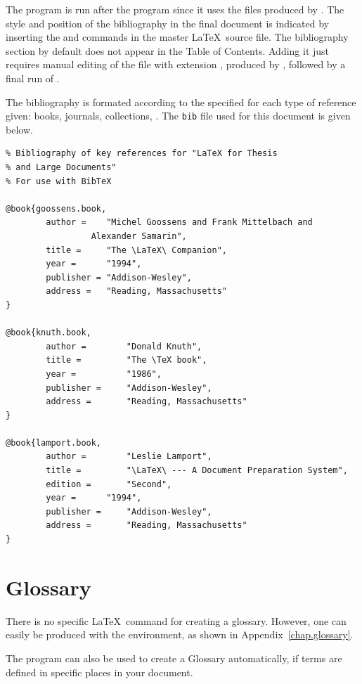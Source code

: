 The  program is run after the  program since it uses the  files produced by .
The style and position of the bibliography in the final document is indicated by inserting the  and  commands in the master \LaTeX\ source file.
The bibliography section by default does not appear in the Table of Contents. 
Adding it just requires manual editing of the file with extension , produced by , followed by a final run of .

The bibliography is formated according to the specified  for each type of reference given: books, journals, collections, \etc .
The \texttt{bib} file used for this document is given below.
\begin{verbatim}
% Bibliography of key references for "LaTeX for Thesis 
% and Large Documents"
% For use with BibTeX

@book{goossens.book,
        author =	"Michel Goossens and Frank Mittelbach and 
        		 Alexander Samarin",
        title =		"The \LaTeX\ Companion",
        year = 		"1994",
        publisher =	"Addison-Wesley",
        address = 	"Reading, Massachusetts"
}

@book{knuth.book,
        author =        "Donald Knuth",
        title =         "The \TeX book",
        year =          "1986",
        publisher =     "Addison-Wesley",
        address =       "Reading, Massachusetts"
}

@book{lamport.book,
        author =        "Leslie Lamport",
        title =         "\LaTeX\ --- A Document Preparation System",
        edition =       "Second",
        year = 		"1994",
        publisher = 	"Addison-Wesley",
        address =       "Reading, Massachusetts"
}
\end{verbatim}
\section{Glossary} 
There is no specific \LaTeX\ command for creating a glossary.
However, one can easily be produced with the  environment, as shown in Appendix~\ref{chap.glossary}. 

The  program can also be used to create a Glossary automatically, if terms are defined in specific places in your document.
